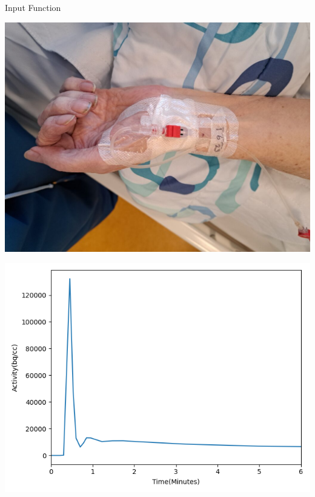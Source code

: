 \documentclass[aspectratio=169]{beamer}
\begin{document}
\begin{frame}{Input Function}
	\begin{center}
		\begin{minipage}{0.34\textwidth}
			\includegraphics[width=\linewidth]{catheter2.jpg}
		\end{minipage}
		\begin{minipage}{0.36\textwidth}
			\includegraphics[width=\linewidth]{aif.png}
		\end{minipage}
		\vfill
	\end{center}

\end{frame}
\end{document}

